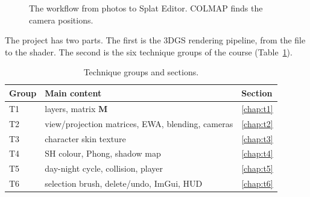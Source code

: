 \documentclass[9pt,twocolumn,a4paper]{extarticle}
\newcommand{\code}[1]{\texttt{#1}}
\begin{document}
\begin{figure}[H]
\centering
{}
\caption{The workflow from photos to Splat Editor. COLMAP \cite{schonberger2016colmap} finds the camera positions.}
\label{fig:pipeline}
\end{figure}

The project has two parts. The first is the 3DGS rendering pipeline, from the file to the shader. The second is the six technique groups of the course (Table~\ref{tab:map}).

\begin{table}[H]
\centering
\caption{Technique groups and sections.}
\label{tab:map}
\footnotesize
\begin{tabular}{@{}lll@{}}
\toprule
Group & Main content & Section \\
\midrule
T1 & layers, matrix $\mathbf{M}$ & \ref{chap:t1} \\
T2 & view/projection matrices, EWA, blending, cameras & \ref{chap:t2} \\
T3 & character skin texture & \ref{chap:t3} \\
T4 & SH colour, Phong, shadow map & \ref{chap:t4} \\
T5 & day-night cycle, collision, player & \ref{chap:t5} \\
T6 & selection brush, delete/undo, ImGui, HUD & \ref{chap:t6} \\
\bottomrule
\end{tabular}
\end{table}
\end{document}
